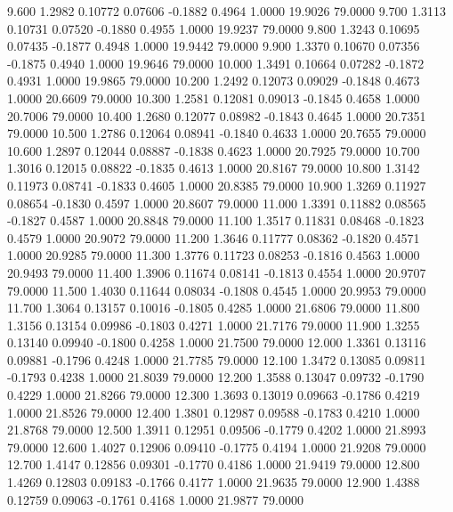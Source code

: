    9.600   1.2982   0.10772   0.07606  -0.1882   0.4964   1.0000  19.9026  79.0000
   9.700   1.3113   0.10731   0.07520  -0.1880   0.4955   1.0000  19.9237  79.0000
   9.800   1.3243   0.10695   0.07435  -0.1877   0.4948   1.0000  19.9442  79.0000
   9.900   1.3370   0.10670   0.07356  -0.1875   0.4940   1.0000  19.9646  79.0000
  10.000   1.3491   0.10664   0.07282  -0.1872   0.4931   1.0000  19.9865  79.0000
  10.200   1.2492   0.12073   0.09029  -0.1848   0.4673   1.0000  20.6609  79.0000
  10.300   1.2581   0.12081   0.09013  -0.1845   0.4658   1.0000  20.7006  79.0000
  10.400   1.2680   0.12077   0.08982  -0.1843   0.4645   1.0000  20.7351  79.0000
  10.500   1.2786   0.12064   0.08941  -0.1840   0.4633   1.0000  20.7655  79.0000
  10.600   1.2897   0.12044   0.08887  -0.1838   0.4623   1.0000  20.7925  79.0000
  10.700   1.3016   0.12015   0.08822  -0.1835   0.4613   1.0000  20.8167  79.0000
  10.800   1.3142   0.11973   0.08741  -0.1833   0.4605   1.0000  20.8385  79.0000
  10.900   1.3269   0.11927   0.08654  -0.1830   0.4597   1.0000  20.8607  79.0000
  11.000   1.3391   0.11882   0.08565  -0.1827   0.4587   1.0000  20.8848  79.0000
  11.100   1.3517   0.11831   0.08468  -0.1823   0.4579   1.0000  20.9072  79.0000
  11.200   1.3646   0.11777   0.08362  -0.1820   0.4571   1.0000  20.9285  79.0000
  11.300   1.3776   0.11723   0.08253  -0.1816   0.4563   1.0000  20.9493  79.0000
  11.400   1.3906   0.11674   0.08141  -0.1813   0.4554   1.0000  20.9707  79.0000
  11.500   1.4030   0.11644   0.08034  -0.1808   0.4545   1.0000  20.9953  79.0000
  11.700   1.3064   0.13157   0.10016  -0.1805   0.4285   1.0000  21.6806  79.0000
  11.800   1.3156   0.13154   0.09986  -0.1803   0.4271   1.0000  21.7176  79.0000
  11.900   1.3255   0.13140   0.09940  -0.1800   0.4258   1.0000  21.7500  79.0000
  12.000   1.3361   0.13116   0.09881  -0.1796   0.4248   1.0000  21.7785  79.0000
  12.100   1.3472   0.13085   0.09811  -0.1793   0.4238   1.0000  21.8039  79.0000
  12.200   1.3588   0.13047   0.09732  -0.1790   0.4229   1.0000  21.8266  79.0000
  12.300   1.3693   0.13019   0.09663  -0.1786   0.4219   1.0000  21.8526  79.0000
  12.400   1.3801   0.12987   0.09588  -0.1783   0.4210   1.0000  21.8768  79.0000
  12.500   1.3911   0.12951   0.09506  -0.1779   0.4202   1.0000  21.8993  79.0000
  12.600   1.4027   0.12906   0.09410  -0.1775   0.4194   1.0000  21.9208  79.0000
  12.700   1.4147   0.12856   0.09301  -0.1770   0.4186   1.0000  21.9419  79.0000
  12.800   1.4269   0.12803   0.09183  -0.1766   0.4177   1.0000  21.9635  79.0000
  12.900   1.4388   0.12759   0.09063  -0.1761   0.4168   1.0000  21.9877  79.0000
